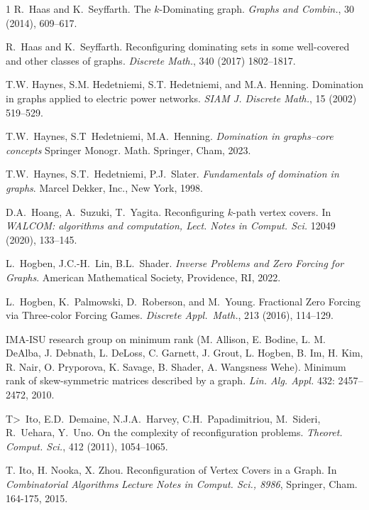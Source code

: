 \documentclass{article}
\numberwithin{figure}{section}
\numberwithin{table}{section}
\numberwithin{equation}{section}
\theoremstyle{definition}
\theoremstyle{definition}
\theoremstyle{definition}
\begin{document}
{\begin{thebibliography}{1}
 R.~Haas and K.~Seyffarth. The $k$-Dominating graph. \emph{Graphs and Combin.}, 30 (2014), 609--617. 


 R.~Haas and K.~Seyffarth. Reconfiguring dominating sets in some well-covered and other classes of graphs. \emph{Discrete Math.}, 340 (2017) 1802--1817.


	T.W. Haynes, S.M. Hedetniemi, S.T. Hedetniemi, and M.A.  Henning. Domination in graphs applied to electric power networks. {\em SIAM J. Discrete Math.}, 15 (2002) 519--529.

T.W.~Haynes, S.T~Hedetniemi, M.A.~Henning.  \emph{Domination in graphs--core concepts}
Springer Monogr. Math.
Springer, Cham, 2023.

 T.W.~Haynes, S.T.~Hedetniemi, P.J.~Slater.
\emph{Fundamentals of domination in graphs}. %
Marcel Dekker, Inc., New York, 1998.

D.A.~Hoang, A.~Suzuki, T.~Yagita.
Reconfiguring $k$-path vertex covers. In \emph{WALCOM: algorithms and computation, 
Lect. Notes in Comput. Sci.} 12049 (2020), 133--145.

  L.~Hogben, J.C.-H.~Lin, B.L.~Shader. {\em Inverse Problems and Zero Forcing for Graphs}. American Mathematical Society,  %
 Providence, RI, 2022.

 L.~Hogben, K.~Palmowski, D.~Roberson, and M.~Young.  Fractional Zero Forcing via Three-color Forcing Games.    {\em Discrete Appl.~Math.}, 213 (2016),  114--129.

 
 IMA-ISU research group on minimum rank (M. Allison,   E. Bodine, L. M.  DeAlba, J. Debnath, L. DeLoss, C. Garnett, J. Grout, L. Hogben, B. Im, H. Kim, R. Nair, O. Pryporova, K. Savage, B.  Shader,  A. Wangsness Wehe).  Minimum rank of skew-symmetric matrices described by a graph.   {\em Lin. Alg. Appl.} 432: 2457--2472, 2010.

T>~Ito, E.D.~Demaine,  N.J.A.~Harvey,  C.H.~Papadimitriou,  M.~Sideri, R.~Uehara, Y.~Uno. On the complexity of reconfiguration problems. 
\emph{Theoret. Comput. Sci.}, 412 (2011),  1054--1065.

 T. Ito, H. Nooka, X. Zhou. Reconfiguration of Vertex Covers in a Graph. In {\em Combinatorial Algorithms} {\em Lecture Notes in Comput. Sci., 8986}, Springer, Cham. 164-175, 2015.


\end{thebibliography}}
\end{document}
